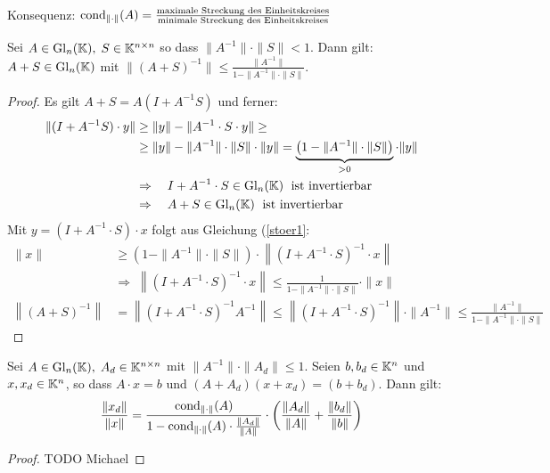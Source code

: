 Konsequenz: $\mathrm{cond}_{\| \cdot \|}(A) = \frac{\text{maximale Streckung des Einheitskreises}}
{\text{minimale Streckung des Einheitskreises}}$

\begin{Lemma}[Störungslemma]
  Sei $A \in \mathrm{Gl}_n(\mathbb K), \; S \in \mathbb K^{n \times n}$ so dass
  $\|A^{-1}\| \cdot \|S\| < 1$. Dann gilt: $A + S \in \mathrm{Gl}_n(\mathbb K)$ mit
  $\|(A + S)^{-1}\| \le \frac{\|A^{-1}\|}{1 - \|A^{-1}\| \cdot \|S\|}$.
\end{Lemma}
\begin{proof}
Es gilt $A + S = A(I + A^{-1} S)$ und ferner:
\begin{align}
   \nonumber
   \|(I + A^{-1} S) \cdot y\| &\ge \|y\| - \|A^{-1} \cdot S \cdot y\|  \ge \\
   \label{stoer1}
   & \ge \|y\| - \|A^{-1}\| \cdot \| S \| \cdot \|y\| =
   \underbrace {\left( 1 - \|A^{-1}\| \cdot \|S\| \right)}_{> 0}  \cdot \|y\| \\
   \nonumber
   & \Rightarrow \quad I + A^{-1} \cdot S  \in \mathrm{Gl}_n(\mathbb K) \; \text{ ist invertierbar}\\
   \nonumber
   & \Rightarrow \quad A + S \in \mathrm{Gl}_n(\mathbb K) \; \text{ ist invertierbar}
\end{align}
Mit $y = (I + A^{-1} \cdot S) \cdot x$ folgt aus Gleichung (\ref{stoer1}:
\begin{align*}
   \|x\| & \ge \left( 1 - \|A^{-1}\| \cdot \|S\| \right) \cdot
     \left\| (I + A^{-1} \cdot S)^{-1} \cdot x \right\| \\
  & \Rightarrow \; \left\| (I + A^{-1} \cdot S)^{-1} \cdot x \right\| \le
     \frac{1}{1 - \|A^{-1}\| \cdot \|S\|} \cdot \|x\|\\
     \left\|(A+S)^{-1}\right\|  & = \left\| (I + A^{-1} \cdot S)^{-1} A^{-1} \right\| \le
     \left\| (I + A^{-1} \cdot S)^{-1} \right\|\cdot \| A^{-1} \| \le
       \frac{\|A^{-1}\|}{1 - \|A^{-1}\| \cdot \|S\|}
\end{align*}
\end{proof}

\begin{Satz}
Sei $A \in \mathrm{Gl}_n(\mathbb K), \; A_d \in \mathbb K^{n \times n}$  mit  $\|A^{-1}\| \cdot \|A_d\| \le 1$.
Seien $b, b_d \in \mathbb K^n$  und  $x, x_d \in \mathbb K^n$, so dass $A \cdot x = b$ und
$(A + A_d)(x + x_d) = (b + b_d)$. Dann gilt:
\begin{align*}
\frac{\|x_d\|}{\|x\|} = \frac{\mathrm{cond}_{\| \cdot \|}(A)}{1 - \mathrm{cond}_{\| \cdot \|}(A) \cdot \frac{\|A_d\|}{\|A\|}} \cdot
\left( \frac{\|A_d\|}{\|A\|} + \frac{\|b_d\|}{\|b\|} \right)
\end{align*}
\end{Satz}
\begin{proof}
  TODO Michael
\end{proof}

